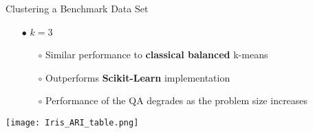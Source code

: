 \begin{frame}[allowframebreaks]{Clustering a Benchmark Data Set}
\begin{itemize}
			\framebreak
			\item[$\bullet$] $k=3$
			\begin{itemize}
				\item[$\circ$] Similar performance to \textbf{classical balanced} k-means
				\item[$\circ$] Outperforms \textbf{Scikit-Learn} implementation
				\item[$\circ$] Performance of the QA degrades as the problem size increases
			\end{itemize}
		\end{itemize}
		\begin{center}
			\texttt{[image: Iris\_ARI\_table.png]}
		\end{center}
	\end{frame}